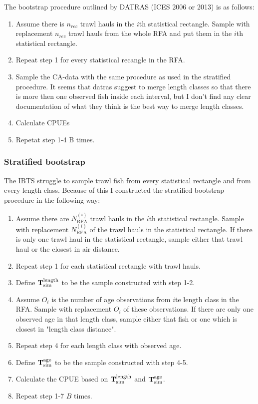 \documentclass[a4paper 12pt]{article}
\numberwithin{equation}{section}
\begin{document}

The bootstrap procedure outlined by DATRAS (ICES 2006 or 2013) is as follows:
 \begin{enumerate} 
\item  Assume there is $n_{rec}$ trawl hauls in the $i$th statistical rectangle. Sample with replacement $n_{rec}$ trawl hauls from the whole RFA and put them in the $i$th statistical rectangle. 
\item Repeat step 1 for every statistical recangle in the RFA. 
\item Sample the CA-data with the same procedure as used in the stratified procedure. It seems that datras suggest to merge length classes so that there is more then one observed fish inside each interval, but I don't find any clear documentation of what they think is the best way to merge length classes.   
\item Calculate CPUEs 
\item Repetat step 1-4 B times. 
 \end{enumerate} 
 

\subsubsection{Stratified bootstrap}
\label{stratboot}
The IBTS struggle to sample trawl fish from every statistical rectangle and from every length class. Because of this I constructed the stratified bootstrap procedure in the following way: 

\begin{enumerate}
\item Assume there are $N_{\text{RFA}}^{(i)}$ trawl hauls in the $i$th statistical rectangle.  Sample with replacement $N_{\text{RFA}}^{(i)}$ of the trawl hauls in the statistical rectangle. If there is only one trawl haul in the statistical rectangle, sample either that trawl haul or the closest in air distance. 
\item Repeat step 1 for each statistical rectangle with trawl hauls. 
\item Define ${\bf T}_{\text{sim}}^{\text{length}}$ to be the sample constructed with step 1-2.
\item Assume $O_i$ is the number of age observations from $i$te length class in the RFA. Sample with replacement $O_i$ of these observations. If there are only one observed age in that length class, sample either that fish or one which is closest in "length class distance".
\item Repeat step 4 for each length class with observed age. 
\item Define ${\bf T}_{\text{sim}}^{\text{age}}$ to be the sample constructed with step 4-5.
\item Calculate the CPUE based on ${\bf T }_{\text{sim}}^{\text{length}}$ and ${\bf T}_{\text{sim}}^{\text{age}}$. 
\item Repeat step 1-7 $B$ times.
\end{enumerate}  
\end{document}
